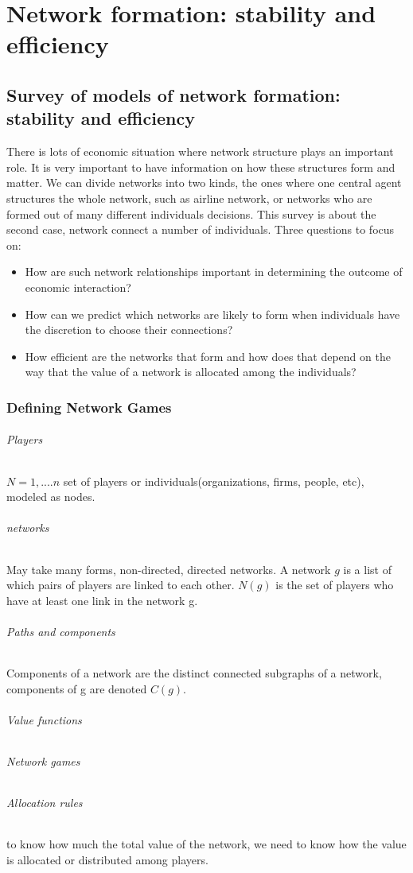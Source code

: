 \chapter{Network formation: stability and efficiency}
\label{chp:network} 
\section{Survey of models of network formation: stability and efficiency}

There is lots of economic situation where network structure plays an important role. 
It is very important to have information on how these structures form and matter.
We can divide networks into two kinds, the ones where one central agent structures the whole network,
 such as airline network, or networks who are formed out of many different individuals decisions.
 This survey is about the second case, network connect a number of individuals.\cite{jackson2005survey}
 Three questions to focus on:
 \begin{itemize}
 \item How are such network relationships important in determining the outcome of economic interaction?
 \item How can we predict which networks are likely to form when individuals have the discretion to choose their connections?
 \item How efficient are the networks that form and how does that depend on the way that the value of a network is allocated among the individuals?
 \end{itemize}
\subsection{Defining Network Games}
\subparagraph{Players}
$N={1,....n} $ set of players or individuals(organizations, firms, people, etc), modeled as nodes.
\subparagraph{networks}
May take many forms, non-directed, directed networks.
A network $g$ is a list of which pairs of players are linked to each other. 
$N(g)$ is the set of players who have at least one link in the network g.
\subparagraph{Paths and components}
Components of a network are the distinct connected subgraphs of a network, components of g are denoted $C(g)$. 
\subparagraph{Value functions}
\subparagraph{Network games}
\subparagraph{Allocation rules}
to know how much the total value of the network, we need to know how the value is allocated or distributed among players. 





